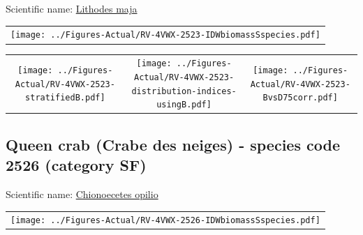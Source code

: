 \documentclass[12pt]{article}\usepackage[]{graphicx}\usepackage[]{color}
\begin{document}
  


Scientific name: \href{http://www.marinespecies.org/aphia.php?p=taxdetails\&id=107205}{Lithodes maja} \newline
\begin{minipage}{1.0\textwidth}
 \begin{tabular}{c}
\texttt{[image: ../Figures-Actual/RV-4VWX-2523-IDWbiomassSspecies.pdf]} \\ 
\end{tabular} 
\end{minipage}
\newline

\vspace{1cm}
\begin{minipage}{1.0\textwidth}
 \begin{tabular}{ccc}
\texttt{[image: ../Figures-Actual/RV-4VWX-2523-stratifiedB.pdf]} & 
\texttt{[image: ../Figures-Actual/RV-4VWX-2523-distribution-indices-usingB.pdf]} & 
\texttt{[image: ../Figures-Actual/RV-4VWX-2523-BvsD75corr.pdf]} \\ 
\end{tabular} 
\end{minipage}
\clearpage

\renewcommand\thefigure{\thesubsection\Alph{figure}}

\setcounter{figure}{0}

\hypertarget{sec:2526}{%
\subsection{Queen crab (Crabe des neiges) - species code 2526 (category SF)}\label{sec:2526}}

  


Scientific name: \href{http://www.marinespecies.org/aphia.php?p=taxdetails\&id=107315}{Chionoecetes opilio} \newline
\begin{minipage}{1.0\textwidth}
 \begin{tabular}{c}
\texttt{[image: ../Figures-Actual/RV-4VWX-2526-IDWbiomassSspecies.pdf]} \\ 
\end{tabular} 
\end{minipage}
\newline
\end{document}
